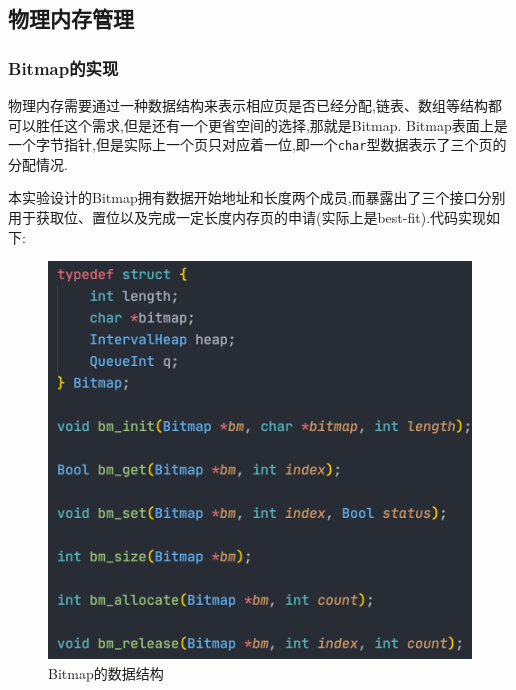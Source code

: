 \subsection{物理内存管理}
\subsubsection{Bitmap的实现}
物理内存需要通过一种数据结构来表示相应页是否已经分配,链表、数组等结构都可以胜任这个需求,但是还有一个更省空间的选择,那就是Bitmap. Bitmap表面上是一个字节指针,但是实际上一个页只对应着一位,即一个\texttt{char}型数据表示了三个页的分配情况.

本实验设计的Bitmap拥有数据开始地址和长度两个成员,而暴露出了三个接口分别用于获取位、置位以及完成一定长度内存页的申请(实际上是best-fit).代码实现如下:

\begin{figure}[H]
    \centering
    \includegraphics[width=\textwidth]{figures/bm0.png}
    \caption{Bitmap的数据结构}
    \label{fig:my_label}
\end{figure}

